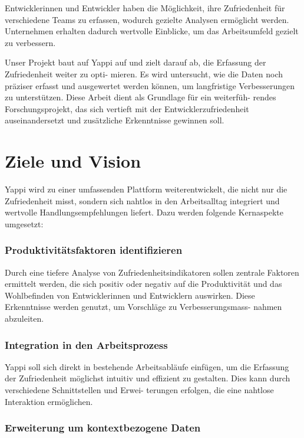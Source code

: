 \documentclass[12pt,a4paper]{report}
\begin{document}
Entwicklerinnen und Entwickler haben die Möglichkeit, ihre Zufriedenheit für verschiedene Teams zu
erfassen, wodurch gezielte Analysen ermöglicht werden. Unternehmen erhalten dadurch wertvolle
Einblicke, um das Arbeitsumfeld gezielt zu verbessern.

Unser Projekt baut auf Yappi auf und zielt darauf ab, die Erfassung der Zufriedenheit weiter zu opti-
mieren. Es wird untersucht, wie die Daten noch präziser erfasst und ausgewertet werden können,
um langfristige Verbesserungen zu unterstützen. Diese Arbeit dient als Grundlage für ein weiterfüh-
rendes Forschungsprojekt, das sich vertieft mit der Entwicklerzufriedenheit auseinandersetzt und
zusätzliche Erkenntnisse gewinnen soll.

\section{Ziele und Vision}

Yappi wird zu einer umfassenden Plattform weiterentwickelt, die nicht nur die Zufriedenheit misst,
sondern sich nahtlos in den Arbeitsalltag integriert und wertvolle Handlungsempfehlungen liefert.
Dazu werden folgende Kernaspekte umgesetzt:

\subsubsection{Produktivitätsfaktoren identifizieren}

Durch eine tiefere Analyse von Zufriedenheitsindikatoren sollen zentrale Faktoren ermittelt werden,
die sich positiv oder negativ auf die Produktivität und das Wohlbefinden von Entwicklerinnen und
Entwicklern auswirken. Diese Erkenntnisse werden genutzt, um Vorschläge zu Verbesserungsmass-
nahmen abzuleiten.

\subsubsection{Integration in den Arbeitsprozess}

Yappi soll sich direkt in bestehende Arbeitsabläufe einfügen, um die Erfassung der Zufriedenheit
möglichst intuitiv und effizient zu gestalten. Dies kann durch verschiedene Schnittstellen und Erwei-
terungen erfolgen, die eine nahtlose Interaktion ermöglichen.

\subsubsection{Erweiterung um kontextbezogene Daten}
\end{document}
